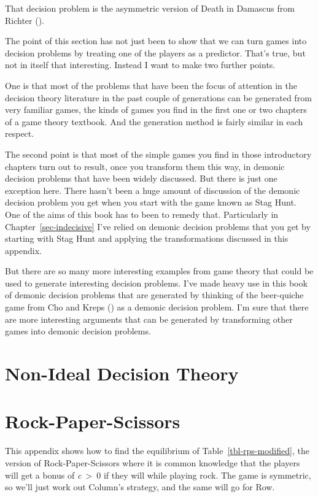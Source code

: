 \documentclass[
  12pt,
  letterpaper,
  DIV=11,
  numbers=noendperiod]{scrreprt}
\begin{document}
That decision problem is the asymmetric version of Death in Damascus
from Richter ().

The point of this section has not just been to show that we can turn
games into decision problems by treating one of the players as a
predictor. That's true, but not in itself that interesting. Instead I
want to make two further points.

One is that most of the problems that have been the focus of attention
in the decision theory literature in the past couple of generations can
be generated from very familiar games, the kinds of games you find in
the first one or two chapters of a game theory textbook. And the
generation method is fairly similar in each respect.

The second point is that most of the simple games you find in those
introductory chapters turn out to result, once you transform them this
way, in demonic decision problems that have been widely discussed. But
there is just one exception here. There hasn't been a huge amount of
discussion of the demonic decision problem you get when you start with
the game known as Stag Hunt. One of the aims of this book has to been to
remedy that. Particularly in Chapter~\ref{sec-indecisive} I've relied on
demonic decision problems that you get by starting with Stag Hunt and
applying the transformations discussed in this appendix.

But there are so many more interesting examples from game theory that
could be used to generate interesting decision problems. I've made heavy
use in this book of demonic decision problems that are generated by
thinking of the beer-quiche game from Cho and Kreps
() as a demonic decision problem. I'm
sure that there are more interesting arguments that can be generated by
transforming other games into demonic decision problems.

\chapter{Non-Ideal Decision Theory}\label{sec-nidt}

\chapter{Rock-Paper-Scissors}\label{sec-rps}

This appendix shows how to find the equilibrium of
Table~\ref{tbl-rps-modified}, the version of Rock-Paper-Scissors where
it is common knowledge that the players will get a bonus of
\emph{c}~\textgreater~0 if they will while playing rock. The game is
symmetric, so we'll just work out Column's strategy, and the same will
go for Row.
\end{document}
